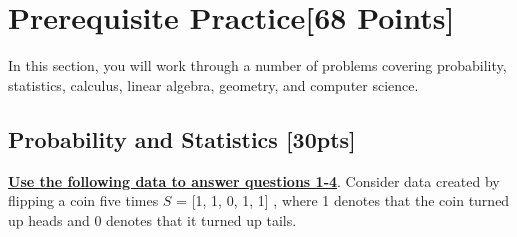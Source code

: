 \documentclass[12pt]{article}
\begin{document}
\section{Prerequisite Practice[68 Points]}

In this section, you will work through a number of problems covering probability, statistics, calculus, linear algebra, geometry, and computer science. 

\subsection{Probability and Statistics [30pts]}

\textbf{\underline{Use the following data to answer questions 1-4}}. Consider data created by flipping a coin five times $S $ = [1, 1, 0, 1, 1] , where 1 denotes that the coin turned up heads and 0 denotes that it turned up tails. \bigskip
\end{document}
